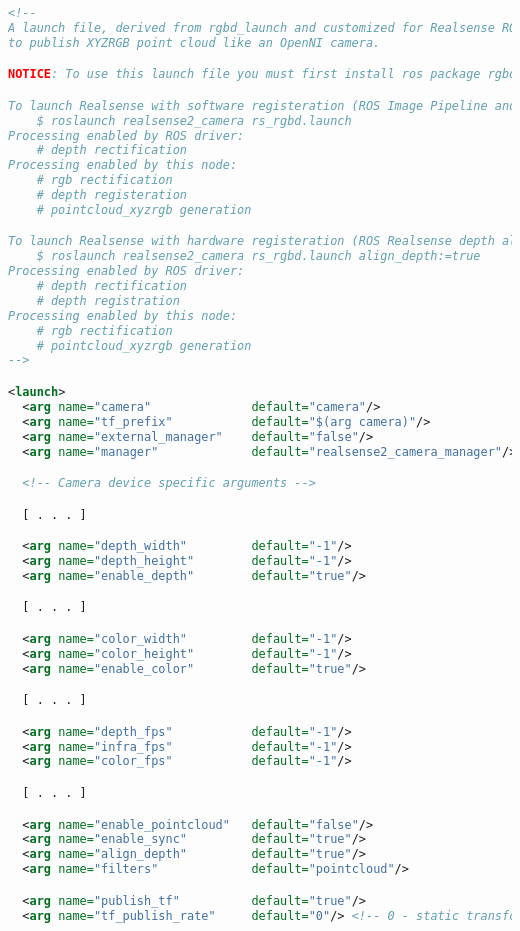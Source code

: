 \begin{lstlisting}[language=xml]
<!--
A launch file, derived from rgbd_launch and customized for Realsense ROS driver,
to publish XYZRGB point cloud like an OpenNI camera.

NOTICE: To use this launch file you must first install ros package rgbd_launch.

To launch Realsense with software registeration (ROS Image Pipeline and rgbd_launch):
    $ roslaunch realsense2_camera rs_rgbd.launch
Processing enabled by ROS driver:
    # depth rectification
Processing enabled by this node:
    # rgb rectification
    # depth registeration
    # pointcloud_xyzrgb generation

To launch Realsense with hardware registeration (ROS Realsense depth alignment):
    $ roslaunch realsense2_camera rs_rgbd.launch align_depth:=true
Processing enabled by ROS driver:
    # depth rectification
    # depth registration
Processing enabled by this node:
    # rgb rectification
    # pointcloud_xyzrgb generation
-->

<launch>
  <arg name="camera"              default="camera"/>
  <arg name="tf_prefix"           default="$(arg camera)"/>
  <arg name="external_manager"    default="false"/>
  <arg name="manager"             default="realsense2_camera_manager"/>

  <!-- Camera device specific arguments -->

  [ . . . ]

  <arg name="depth_width"         default="-1"/>
  <arg name="depth_height"        default="-1"/>
  <arg name="enable_depth"        default="true"/>

  [ . . . ]

  <arg name="color_width"         default="-1"/>
  <arg name="color_height"        default="-1"/>
  <arg name="enable_color"        default="true"/>

  [ . . . ]

  <arg name="depth_fps"           default="-1"/>
  <arg name="infra_fps"           default="-1"/>
  <arg name="color_fps"           default="-1"/>

  [ . . . ]

  <arg name="enable_pointcloud"   default="false"/>
  <arg name="enable_sync"         default="true"/>
  <arg name="align_depth"         default="true"/>
  <arg name="filters"             default="pointcloud"/>

  <arg name="publish_tf"          default="true"/>
  <arg name="tf_publish_rate"     default="0"/> <!-- 0 - static transform -->


\end{lstlisting}
